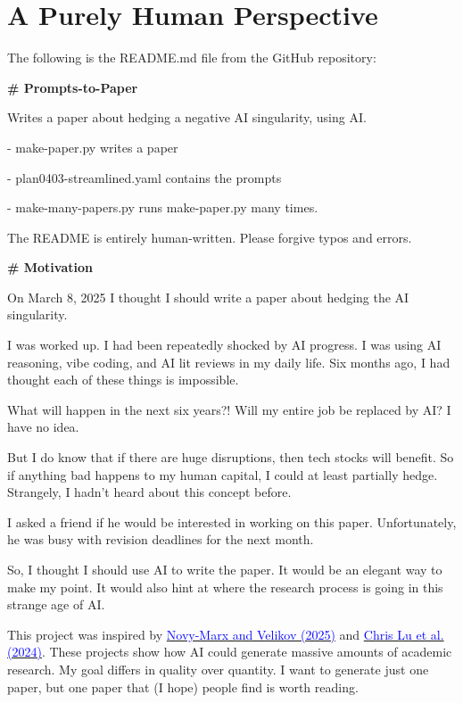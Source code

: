 \section{A Purely Human Perspective} \label{app:readme}
The following is the README.md file from the GitHub repository:
\vspace{-1ex}
\begin{mdframed}[linewidth=1pt, linecolor=black]
\begingroup
\small
\ttfamily
\linespread{1}
\setlength{\parindent}{0pt}
\setlength{\parskip}{0.5\baselineskip}
\sloppy
\setlength{\emergencystretch}{3em}
\textbf{\textcolor{red!70!black}{\# Prompts-to-Paper}}

Writes a paper about hedging a negative AI singularity, using AI.

- \colorbox{gray!10}{\textcolor{red!70!black}{make-paper.py}} writes a paper

- \colorbox{gray!10}{\textcolor{red!70!black}{plan0403-streamlined.yaml}} contains the prompts

- \colorbox{gray!10}{\textcolor{red!70!black}{make-many-papers.py}} runs \colorbox{gray!10}{\textcolor{red!70!black}{make-paper.py}} many times.


The README is entirely human-written. Please forgive typos and errors.

\textbf{\textcolor{red!70!black}{\# Motivation}}

On March 8, 2025 I thought I should write a paper about hedging the AI singularity.

I was worked up. I had been repeatedly shocked by AI progress. I was using AI reasoning, vibe coding, and AI lit reviews in my daily life. Six months ago, I had thought each of these things is impossible.

What will happen in the next six years?! Will my entire job be replaced by AI? I have no idea.

But I do know that if there are huge disruptions, then tech stocks will benefit. So if anything bad happens to my human capital, I could at least partially hedge. Strangely, I hadn't heard about this concept before.

I asked a friend if he would be interested in working on this paper. Unfortunately, he was busy with revision deadlines for the next month. 

So, I thought I should use AI to write the paper. It would be an elegant way to make my point. It would also hint at where the research process is going in this strange age of AI.

This project was inspired by \href{https://www.nber.org/papers/w33363}{\textcolor{blue}{Novy-Marx and Velikov (2025)}}  and \href{https://arxiv.org/abs/2408.06292}{\textcolor{blue}{Chris Lu et al. (2024)}}. These projects show how AI could generate massive amounts of academic research. My goal differs in quality over quantity. I want to generate just one paper, but one paper that (I hope) people find is worth reading.


\end{mdframed}
